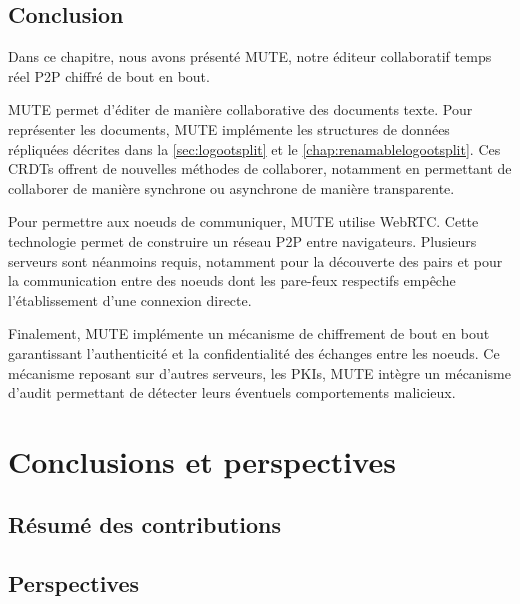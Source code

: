 \documentclass[12pt]{thesul}
\newcommand{\lepoch}{$<_{\varepsilon}$~}
\begin{document}

\section{Conclusion}

Dans ce chapitre, nous avons présenté \acf{MUTE}, notre éditeur collaboratif temps réel \ac{P2P} chiffré de bout en bout.

MUTE permet d'éditer de manière collaborative des documents texte.
Pour représenter les documents, MUTE implémente les structures de données répliquées décrites dans la \autoref{sec:logootsplit} et le \autoref{chap:renamablelogootsplit}.
Ces \acp{CRDT} offrent de nouvelles méthodes de collaborer, notamment en permettant de collaborer de manière synchrone ou asynchrone de manière transparente.

Pour permettre aux noeuds de communiquer, MUTE utilise WebRTC.
Cette technologie permet de construire un réseau \ac{P2P} entre navigateurs.
Plusieurs serveurs sont néanmoins requis, notamment pour la découverte des pairs et pour la communication entre des noeuds dont les pare-feux respectifs empêche l'établissement d'une connexion directe.

Finalement, MUTE implémente un mécanisme de chiffrement de bout en bout garantissant l'authenticité et la confidentialité des échanges entre les noeuds.
Ce mécanisme reposant sur d'autres serveurs, les PKIs, MUTE intègre un mécanisme d'audit permettant de détecter leurs éventuels comportements malicieux.


\NumberThisInToc
\chapter{Conclusions et perspectives}
\minitoc
\section{Résumé des contributions}
\section{Perspectives}

\end{document}
